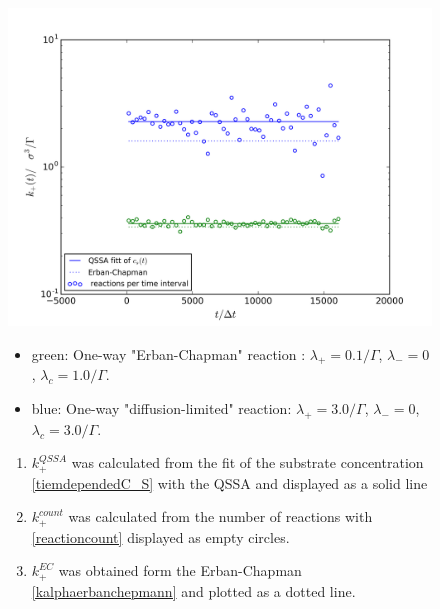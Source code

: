\documentclass[
  a4paper,BCOR10mm,twoside,
  headsepline,footsepline,%
  fleqn,openbib
]{scrbook}
\begin{document}
\begin{figure}
  \centering
  \includegraphics[width=\textwidth]{./data/chapman-limit-concentrations1_k1.png}
  \captionsetup{width=\linewidth}
  \begin{small}
  \begin{itemize}
  \item green: One-way "Erban-Chapman" reaction :  $\lambda_+=0.1/\Gamma$, $\lambda_-=0$,  $\lambda_c=1.0/\Gamma$.
  \item blue: One-way "diffusion-limited" reaction: $\lambda_+=3.0/\Gamma$, $\lambda_-=0$,  $\lambda_c=3.0/\Gamma$.
  \end{itemize}
  \begin{enumerate}
  \item $k^{QSSA}_+$ was calculated from the fit of the substrate concentration \cref{tiemdependedC_S} with the QSSA and displayed as a solid line
  \item $k^{count}_+$ was calculated from the number of reactions with \cref{reactioncount} displayed as empty circles.
  \item  $k^{EC}_+$ was obtained form the Erban-Chapman \cref{kalphaerbanchepmann} and plotted as a dotted line.
  \end{enumerate}
  \end{small}

\end{figure}
\end{document}
